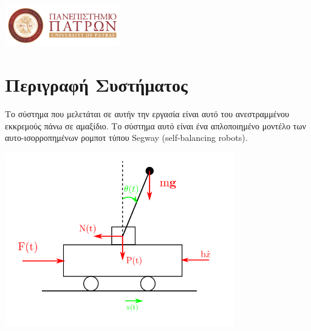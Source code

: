\documentclass[10pt]{article}
\begin{document}
\begin{titlepage}

\begin{center}
\includegraphics[width=5cm]{images/up_2017_logo_gr.png}\\[1cm] %
\end{center}
 

\vfill %

\end{titlepage}



\renewcommand*\contentsname{Περιεχόμενα}
\tableofcontents


\newpage

\section{Περιγραφή Συστήματος}

Το σύστημα που μελετάται σε αυτήν την εργασία είναι αυτό του ανεστραμμένου εκκρεμούς πάνω σε αμαξίδιο. Το σύστημα αυτό είναι ένα 
απλοποιημένο μοντέλο των αυτο-ισορροπημένων ρομποτ τύπου Segway (self-balancing robots).

\begin{center}
\includegraphics[width=10cm]{images/system.png}
\end{center}
\end{document}
